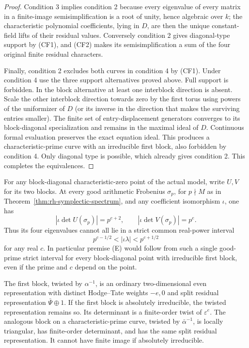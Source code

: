\begin{proof}
Condition 3 implies condition 2 because every
eigenvalue of every matrix in a finite-image
semisimplification is a root of unity, hence
algebraic over \(k\); the characteristic polynomial
coefficients, lying in \(D\), are then the unique
constant-field lifts of their residual values.
Conversely condition 2 gives diagonal-type support
by (CF1), and (CF2) makes its semisimplification a
sum of the four original finite residual characters.

Finally, condition 2 excludes both curves in
condition 4 by (CF1). Under condition 4 use the
three support alternatives proved above.
Full support is forbidden. In the block alternative
at least one interblock direction is absent.
Scale the other interblock direction towards zero
by the first torus using powers of the uniformizer
of \(D\) (or its inverse in the direction that makes
the surviving entries smaller).
The finite set of entry-displacement generators
converges to its block-diagonal specialization
and remains in the maximal ideal of \(D\).
Continuous formal evaluation preserves the exact
equation ideal. This produces a characteristic-prime
curve with an irreducible first block, also
forbidden by condition 4. Only diagonal type is
possible, which already gives condition 2.
This completes the equivalences.
\end{proof}

\begin{proposition}
\label{prop:rh-sp4-even-endpoints}
For any block-diagonal characteristic-zero point of
the actual model, write \(U,V\) for its two blocks.
At every good arithmetic Frobenius \(\sigma_p\), for
\(p\nmid M\) as in Theorem~\ref{thm:rh-symplectic-spectrum},
and any coefficient isomorphism \(\iota\), one has
\[
 |\iota\det U(\sigma_p)|=p^{e+2},\qquad
 |\iota\det V(\sigma_p)|=p^e .                            \tag{CF3}
\]
Thus its four eigenvalues cannot all lie in a strict
common real-power interval
\[
             p^{c-1/2}<|\iota\lambda|<p^{c+1/2}
                                                               \tag{CF4}
\]
for any real \(c\).
In particular premise (E) would follow from
such a single good-prime strict interval for
every block-diagonal point with irreducible first
block, even if the prime and \(c\) depend on the point.

The first block, twisted by \(\alpha^{-1}\), is an
ordinary two-dimensional even representation
with distinct Hodge--Tate weights \(-e,0\) and
split residual representation
\(\bar\Psi\oplus1\).
If the first block is absolutely irreducible,
the twisted representation remains so. Its
determinant is a finite-order twist of
\(\varepsilon^e\).
The analogous block on a characteristic-prime
curve, twisted by \(\bar\alpha^{-1}\), is
locally triangular, has finite-order determinant,
and has the same split residual representation.
It cannot have finite image if absolutely irreducible.
\end{proposition}

